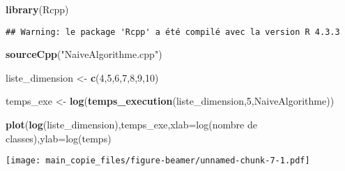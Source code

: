 \documentclass[
  ignorenonframetext,
]{beamer}
\newenvironment{Shaded}{\begin{snugshade}}{\end{snugshade}}
\newcommand{\AttributeTok}[1]{\textcolor[rgb]{0.13,0.29,0.53}{#1}}
\newcommand{\DecValTok}[1]{\textcolor[rgb]{0.00,0.00,0.81}{#1}}
\newcommand{\FunctionTok}[1]{\textcolor[rgb]{0.13,0.29,0.53}{\textbf{#1}}}
\newcommand{\NormalTok}[1]{#1}
\newcommand{\OtherTok}[1]{\textcolor[rgb]{0.56,0.35,0.01}{#1}}
\newcommand{\StringTok}[1]{\textcolor[rgb]{0.31,0.60,0.02}{#1}}
\begin{document}
\begin{frame}[fragile]{}
\protect\hypertarget{section-11}{}
\begin{Shaded}
\begin{Highlighting}[]
\FunctionTok{library}\NormalTok{(Rcpp)}
\end{Highlighting}
\end{Shaded}

\begin{verbatim}
## Warning: le package 'Rcpp' a été compilé avec la version R 4.3.3
\end{verbatim}

\begin{Shaded}
\begin{Highlighting}[]
\FunctionTok{sourceCpp}\NormalTok{(}\StringTok{"NaiveAlgorithme.cpp"}\NormalTok{)}
\end{Highlighting}
\end{Shaded}

\begin{Shaded}
\begin{Highlighting}[]
\NormalTok{liste\_dimension }\OtherTok{\textless{}{-}} \FunctionTok{c}\NormalTok{(}\DecValTok{4}\NormalTok{,}\DecValTok{5}\NormalTok{,}\DecValTok{6}\NormalTok{,}\DecValTok{7}\NormalTok{,}\DecValTok{8}\NormalTok{,}\DecValTok{9}\NormalTok{,}\DecValTok{10}\NormalTok{)}

\NormalTok{temps\_exe }\OtherTok{\textless{}{-}} \FunctionTok{log}\NormalTok{(}\FunctionTok{temps\_execution}\NormalTok{(liste\_dimension,}\DecValTok{5}\NormalTok{,NaiveAlgorithme)) }

\FunctionTok{plot}\NormalTok{(}\FunctionTok{log}\NormalTok{(liste\_dimension),temps\_exe,}\AttributeTok{xlab=}\StringTok{\textquotesingle{}log(nombre de classes)\textquotesingle{}}\NormalTok{,}\AttributeTok{ylab=}\StringTok{\textquotesingle{}log(temps\textquotesingle{}}\NormalTok{)}
\end{Highlighting}
\end{Shaded}

\texttt{[image: main\_copie\_files/figure-beamer/unnamed-chunk-7-1.pdf]}
\end{frame}
\end{document}
